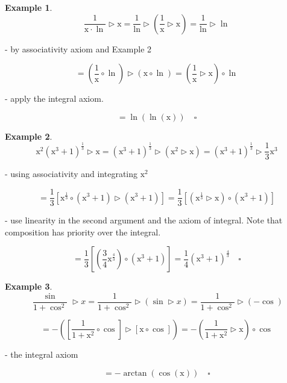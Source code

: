 \documentclass[12pt]{article}
\theoremstyle{definition}
\newtheorem{example}{Example}
\begin{document}
\begin{example}
\[
\frac{1}{\mathrm{x} \cdot \ln} \triangleright \mathrm{x} = \frac{1}{\ln} \triangleright (\frac{1}{\mathrm{x}} \triangleright \mathrm{x}) = \frac{1}{\ln} \triangleright \ln
\]

- by associativity axiom and Example 2

\[
= (\frac{1}{\mathrm{x}} \circ \ln) \triangleright (\mathrm{x} \circ \ln) = (\frac{1}{\mathrm{x}}  \triangleright \mathrm{x}) \circ \ln
\]

- apply the integral axiom.

\[
= \ln(\ln(\mathrm{x})) \quad \square
\]


\end{example}

\newpage
\begin{example}

\[
\mathrm{x}^2 (\mathrm{x}^3 + 1)^\frac{1}{3} \triangleright \mathrm{x} = (\mathrm{x}^3 + 1)^\frac{1}{3} \triangleright (\mathrm{x}^2 \triangleright \mathrm{x}) = (\mathrm{x}^3 + 1)^\frac{1}{3} \triangleright \frac{1}{3} \mathrm{x}^3
\]

- using associativity and integrating $\mathrm{x}^2$

\[
= \frac{1}{3}[\mathrm{x}^\frac{1}{3} \circ (\mathrm{x}^3 + 1) \triangleright (\mathrm{x}^3 + 1)] = \frac{1}{3}[(\mathrm{x}^\frac{1}{3} \triangleright \mathrm{x}) \circ (\mathrm{x}^3 + 1)]
\]

- use linearity in the second argument and the axiom of integral.  Note that composition has priority over the integral.

\[
= \frac{1}{3}[(\frac{3}{4} \mathrm{x}^\frac{4}{3}) \circ (\mathrm{x}^3 + 1)] = \frac{1}{4} (\mathrm{x}^3 + 1)^\frac{4}{3}  \quad \square
\]

\end{example}

\begin{example}

\[
\frac{\sin}{1 + \cos^2} \triangleright x = \frac{1}{1 + \cos^2} \triangleright (\sin \triangleright x) = \frac{1}{1 + \cos^2} \triangleright (-\cos)
\]

\[
= -([\frac{1}{1 + \mathrm{x}^2} \circ \cos] \triangleright [\mathrm{x} \circ \cos]) = -(\frac{1}{1 + \mathrm{x}^2} \triangleright \mathrm{x}) \circ \cos
\]

- the integral axiom

\[
= -\arctan(\cos(\mathrm{x}))  \quad \square
\]

\end{example} 
\end{document}
